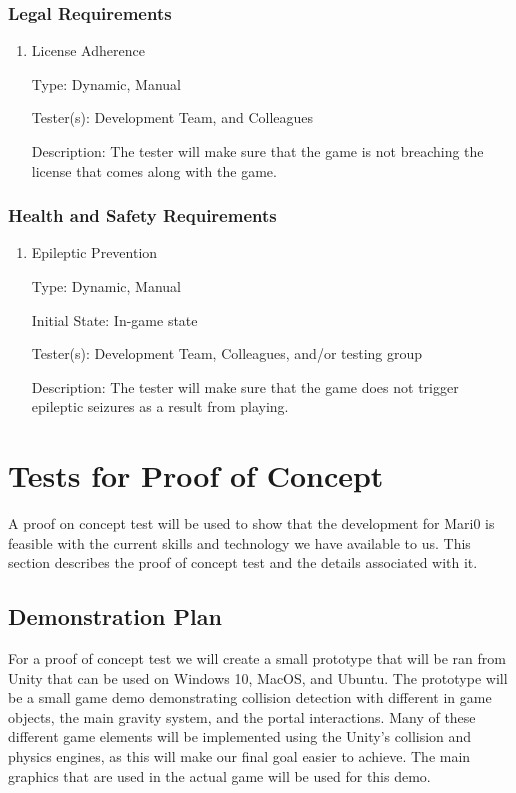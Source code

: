 \documentclass[12pt, titlepage]{article}
\begin{document}
\subsubsection{Legal Requirements}

\begin{enumerate}

\item{License Adherence\\}

Type: Dynamic, Manual

Tester(s): Development Team, and Colleagues

Description: The tester will make sure that the game is not breaching the license that comes along with the game.

\end{enumerate}

\subsubsection{Health and Safety Requirements}

\begin{enumerate}

\item{Epileptic Prevention\\}

Type: Dynamic, Manual

Initial State: In-game state

Tester(s): Development Team, Colleagues, and/or testing group

Description: The tester will make sure that the game does not trigger epileptic seizures as a result from playing.

\end{enumerate}

\section{Tests for Proof of Concept}

A proof on concept test will be used to show that the development for Mari0 is feasible with the current skills and technology we have available to us. This section describes the proof of concept test and the details associated with it.

\subsection{Demonstration Plan}
For a proof of concept test we will create a small prototype that will be ran from Unity that can be used on Windows 10, MacOS, and Ubuntu. The prototype will be a small game demo demonstrating collision detection with different in game objects, the main gravity system, and the portal interactions. Many of these different game elements will be implemented using the Unity's collision and physics engines, as this will make our final goal easier to achieve. The main  graphics that are used in the actual game will be used for this demo.
\end{document}

